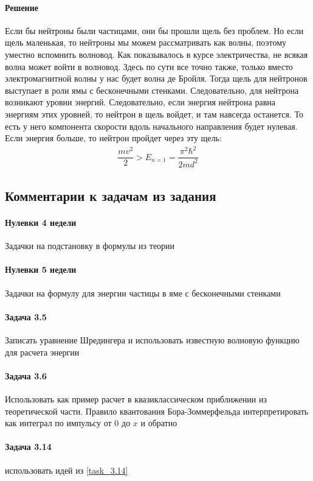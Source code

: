 \documentclass[12pt]{article}
\begin{document}
\paragraph{Решение}
Если бы нейтроны были частицами, они бы прошли щель без проблем. Но если щель маленькая, то нейтроны мы можем рассматривать как волны, поэтому уместно вспомнить волновод. Как показывалось в курсе электричества, не всякая волна может войти в волновод. Здесь по сути все точно также, только вместо электромагнитной волны у нас будет волна де Бройля. Тогда щель для нейтронов выступает в роли ямы с бесконечными стенками. Следовательно, для нейтрона возникают уровни энергий. Следовательно, если энергия нейтрона равна энергиям этих уровней, то нейтрон в щель войдет, и там навсегда останется. То есть у него компонента скорости вдоль начального направления будет нулевая. Если энергия больше, то нейтрон пройдет через эту щель:
\begin{gather*}
    \dfrac{mv^2}{2} > E_{n=1} = \dfrac{\pi^2\hbar^2}{2md^2}
\end{gather*}

\subsection{Комментарии к задачам из задания}
\paragraph{Нулевки 4 недели} Задачки на подстановку в формулы из теории
\paragraph{Нулевки 5 недели} Задачки на формулу для энергии частицы в яме с бесконечными стенками
\paragraph{Задача 3.5} Записать уравнение Шредингера и использовать известную волновую функцию для расчета энергии
\paragraph{Задача 3.6} Использовать как пример расчет в квазиклассическом приближении из теоретической части. Правило квантования Бора-Зоммерфельда интерпретировать как интеграл по импульсу от 0 до $x$ и обратно
\paragraph{Задача 3.14} использовать идей из \ref{task_3.14}
\end{document}
